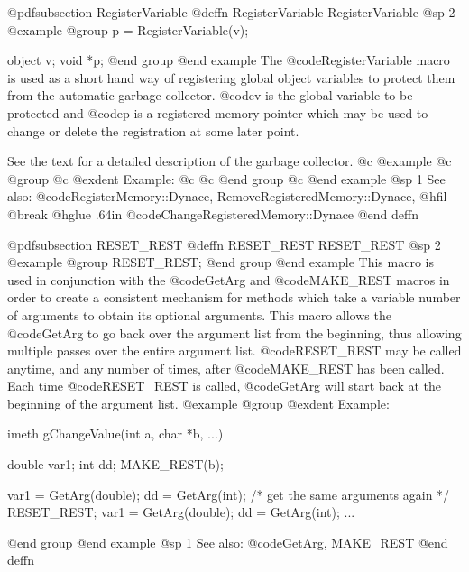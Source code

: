 {{{{@pdfsubsection {RegisterVariable}
@deffn {RegisterVariable} RegisterVariable
@sp 2
@example
@group
p = RegisterVariable(v);

object  v;
void    *p;
@end group
@end example
The @code{RegisterVariable} macro is used as a short hand way of
registering global object variables to protect them from the
automatic garbage collector.  @code{v} is the global variable to be
protected and @code{p} is a registered memory pointer which may
be used to change or delete the registration at some later point.

See the text for a detailed description of the garbage collector.
@c @example
@c @group
@c @exdent Example:
@c 
@c @end group
@c @end example
@sp 1
See also:  @code{RegisterMemory::Dynace, RemoveRegisteredMemory::Dynace,}
@hfil @break @hglue .64in      @code{ChangeRegisteredMemory::Dynace}
@end deffn













@pdfsubsection {RESET_REST}
@deffn {RESET_REST} RESET_REST
@sp 2
@example
@group
RESET_REST;
@end group
@end example
This macro is used in conjunction with the @code{GetArg} and
@code{MAKE_REST} macros in order
to create a consistent mechanism for methods which take a variable
number of arguments to obtain its optional arguments.  This macro
allows the @code{GetArg} to go back over the argument list from
the beginning, thus allowing multiple passes over the entire
argument list.  @code{RESET_REST} may be called anytime, and any
number of times, after @code{MAKE_REST} has been called.  Each time
@code{RESET_REST} is called, @code{GetArg} will start back at the
beginning of the argument list.
@example
@group
@exdent Example:

imeth  gChangeValue(int a, char *b, ...)
{
        double  var1;
        int     dd;
        MAKE_REST(b);

        var1 = GetArg(double);
        dd = GetArg(int);
        /*  get the same arguments again  */
        RESET_REST;
        var1 = GetArg(double);
        dd = GetArg(int);
        ...
}
@end group
@end example
@sp 1
See also:  @code{GetArg, MAKE_REST}
@end deffn



















}}}}
